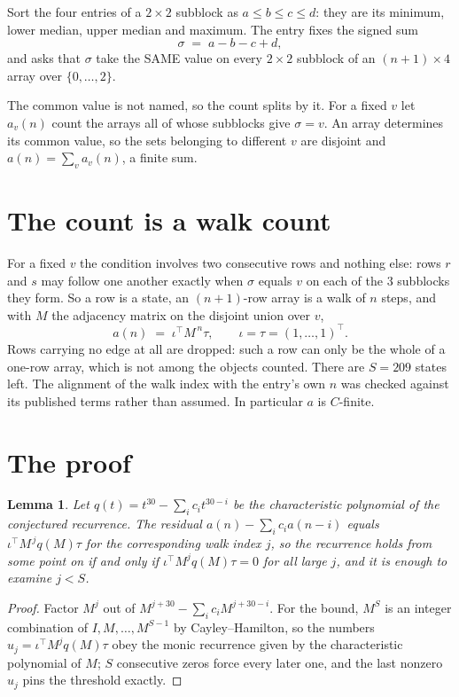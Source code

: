 \documentclass[11pt,a4paper]{article}
\theoremstyle{plain}
\newtheorem{lemma}[theorem]{Lemma}
\theoremstyle{definition}
\begin{document}
Sort the four entries of a $2\times2$ subblock as $a\le b\le c\le d$: they
are its minimum, lower median, upper median and maximum. The entry fixes the signed sum
\[
\sigma\;=\;a-b-c+d,
\]
and asks that $\sigma$ take the SAME value on every $2\times2$ subblock of an
$(n+1)\times4$ array over $\{0,\dots,2\}$.

The common value is not named, so the count splits by it. For a fixed $v$ let $a_v(n)$ count
the arrays all of whose subblocks give $\sigma=v$. An array determines its common value, so
the sets belonging to different $v$ are disjoint and $a(n)=\sum_v a_v(n)$, a finite sum.


\section{The count is a walk count}

For a fixed $v$ the condition involves two consecutive rows and nothing
else: rows $r$ and $s$ may follow one another exactly when $\sigma$ equals $v$ on each of the
$3$ subblocks they form. So a row is a state, an $(n+1)$-row array is a walk of $n$
steps, and with $M$ the adjacency matrix on the disjoint union over $v$,
\[
a(n)\;=\;\iota^{\!\top}M^{\,n}\tau,\qquad\iota=\tau=(1,\dots,1)^{\!\top} .
\]
Rows carrying no edge at all are dropped: such a row can only be the whole of a one-row
array, which is not among the objects counted. There are $S=209$ states left.
The alignment of the walk index with the entry's own $n$ was checked against its published
terms rather than assumed. In particular $a$ is $C$-finite.

\section{The proof}

\begin{lemma}\label{lem:crit}
Let $q(t)=t^{30}-\sum_i c_it^{30-i}$ be the characteristic polynomial of the
conjectured recurrence. The residual $a(n)-\sum_ic_ia(n-i)$ equals
$\iota^{\!\top}M^{\,j}q(M)\tau$ for the corresponding walk index $j$, so the recurrence
holds from some point on if and only if $\iota^{\!\top}M^{j}q(M)\tau=0$ for all large $j$,
and it is enough to examine $j<S$.
\end{lemma}

\begin{proof}
Factor $M^{j}$ out of $M^{j+30}-\sum_ic_iM^{j+30-i}$. For the bound, $M^{S}$
is an integer combination of $I,M,\dots,M^{S-1}$ by Cayley--Hamilton, so the numbers
$u_j=\iota^{\!\top}M^{j}q(M)\tau$ obey the monic recurrence given by the characteristic
polynomial of $M$; $S$ consecutive zeros force every later one, and the last nonzero $u_j$
pins the threshold exactly.
\end{proof}
\end{document}
